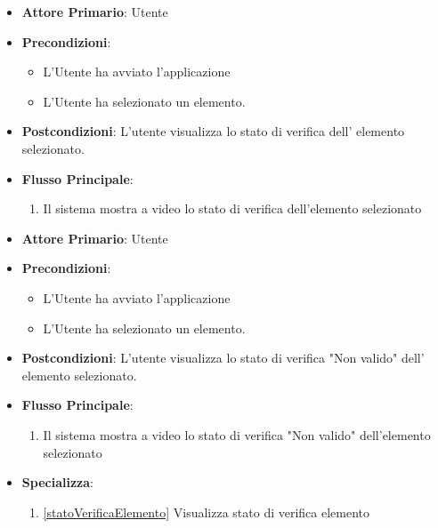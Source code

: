 \begin{itemize}
    \item \textbf{Attore Primario}: Utente
    \item \textbf{Precondizioni}: \begin{itemize}
        \item L'Utente ha avviato l'applicazione
        \item L'Utente ha selezionato un elemento.
    \end{itemize}
    \item \textbf{Postcondizioni}: L'utente visualizza lo stato di verifica dell' elemento selezionato.
    \item \textbf{Flusso Principale}:
    \begin{enumerate}
              \item Il sistema mostra a video lo stato di verifica dell'elemento selezionato
    \end{enumerate}
\end{itemize}

\begin{itemize}
    \item \textbf{Attore Primario}: Utente
    \item \textbf{Precondizioni}: \begin{itemize}
        \item L'Utente ha avviato l'applicazione
        \item L'Utente ha selezionato un elemento.
    \end{itemize}
    \item \textbf{Postcondizioni}: L'utente visualizza lo stato di verifica "Non valido" dell' elemento selezionato.
    \item \textbf{Flusso Principale}:
    \begin{enumerate}
              \item Il sistema mostra a video lo stato di verifica "Non valido" dell'elemento selezionato
    \end{enumerate}
    \item \textbf{Specializza}:
    \begin{enumerate}
              \item \ref{statoVerificaElemento} Visualizza stato di verifica elemento
    \end{enumerate}
\end{itemize}


